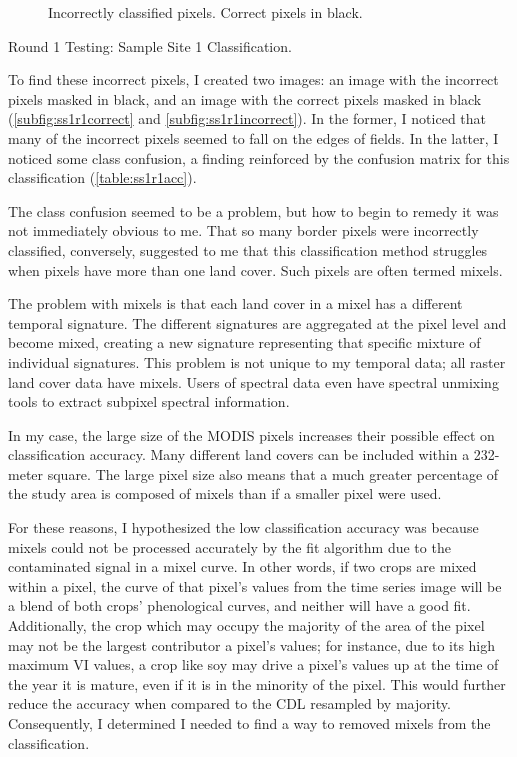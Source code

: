 \begin{ssfigure}
\begin{subfigure}[b]{.475\textwidth}
    \caption{Incorrectly classified pixels. Correct pixels in black.}
    \label{subfig:ss1r1incorrect}
  \end{subfigure}
  \caption{Round 1 Testing: Sample Site 1 Classification.}
  \label{fig:ss1r1class}
\end{ssfigure}

To find these incorrect pixels, I created two images: an image with the incorrect pixels masked in black, and an image with the correct pixels masked in black (\autoref{subfig:ss1r1correct} and \autoref{subfig:ss1r1incorrect}). In the former, I noticed that many of the incorrect pixels seemed to fall on the edges of fields. In the latter, I noticed some class confusion, a finding reinforced by the confusion matrix for this classification (\autoref{table:ss1r1acc}).

The class confusion seemed to be a problem, but how to begin to remedy it was not immediately obvious to me. That so many border pixels were incorrectly classified, conversely, suggested to me that this classification method struggles when pixels have more than one land cover. Such pixels are often termed mixels.

The problem with mixels is that each land cover in a mixel has a different temporal signature. The different signatures are aggregated at the pixel level and become mixed, creating a new signature representing that specific mixture of individual signatures. This problem is not unique to my temporal data; all raster land cover data have mixels. Users of spectral data even have spectral unmixing tools to extract subpixel spectral information. 

In my case, the large size of the MODIS pixels increases their possible effect on classification accuracy. Many different land covers can be included within a 232-meter square. The large pixel size also means that a much greater percentage of the study area is composed of mixels than if a smaller pixel were used.

For these reasons, I hypothesized the low classification accuracy was because mixels could not be processed accurately by the fit algorithm due to the contaminated signal in a mixel curve. In other words, if two crops are mixed within a pixel, the curve of that pixel’s values from the time series image will be a blend of both crops’ phenological curves, and neither will have a good fit. Additionally, the crop which may occupy the majority of the area of the pixel may not be the largest contributor a pixel’s values; for instance, due to its high maximum VI values, a crop like soy may drive a pixel’s values up at the time of the year it is mature, even if it is in the minority of the pixel. This would further reduce the accuracy when compared to the CDL resampled by majority. Consequently, I determined I needed to find a way to removed mixels from the classification.

